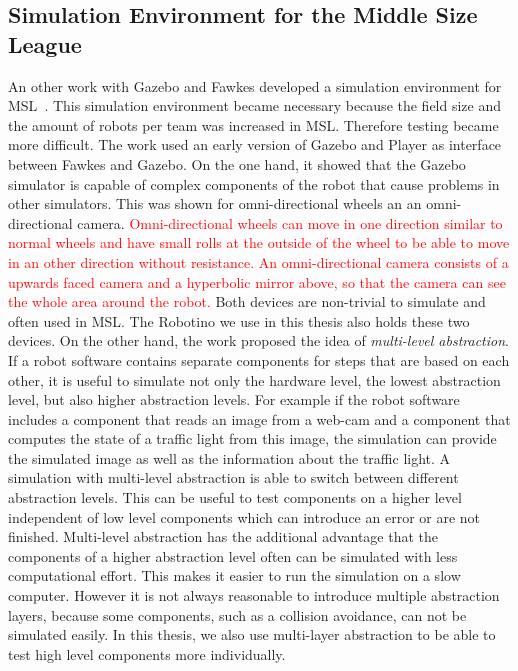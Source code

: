 \subsection{Simulation Environment for the Middle Size League}
An other work with Gazebo and Fawkes developed a simulation environment for MSL~\cite{MultiLevelAbstraction}. This simulation environment became necessary because the field size and the amount of robots per team was increased in MSL. Therefore testing became more difficult. The work used an early version of Gazebo and Player as interface between Fawkes and Gazebo. On the one hand, it showed that the Gazebo simulator is capable of complex components of the robot that cause problems in other simulators. This was shown for omni-directional wheels an an omni-directional camera. \textcolor{red}{Omni-directional wheels can move in one direction similar to normal wheels and have small rolls at the outside of the wheel to be able to move in an other direction without resistance. An omni-directional camera consists of a upwards faced camera and a hyperbolic mirror above, so that the camera can see the whole area around the robot.} Both devices are non-trivial to simulate and often used in MSL. The Robotino we use in this thesis also holds these two devices. On the other hand, the work proposed the idea of \textit{multi-level abstraction}. If a robot software contains separate components for steps that are based on each other, it is useful to simulate not only the hardware level, the lowest abstraction level, but also higher abstraction levels. For example if the robot software includes a component that reads an image from a web-cam and a component that computes the state of a traffic light from this image, the simulation can provide the simulated image as well as the information about the traffic light. A simulation with multi-level abstraction is able to switch between different abstraction levels. This can be useful to test components on a higher level independent of low level components which can introduce an error or are not finished. Multi-level abstraction has the additional advantage that the components of a higher abstraction level often can be simulated with less computational effort. This makes it easier to run the simulation on a slow computer. However it is not always reasonable to introduce multiple abstraction layers, because some components, such as a collision avoidance, can not be simulated easily. In this thesis, we also use multi-layer abstraction to be able to test high level components more individually.


